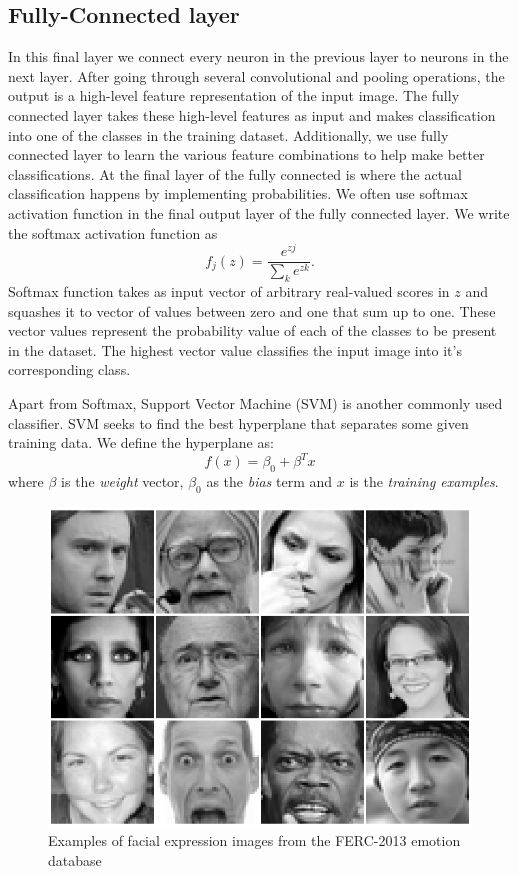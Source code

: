 \documentclass[master]{thesis-uestc}
\begin{document}
\subsection{Fully-Connected layer}
In this final layer we connect every neuron in the previous layer to neurons in the next layer. After going through several convolutional and pooling operations, the output is a high-level feature representation of the input image. The fully connected layer takes these high-level features as input and makes classification into one of the classes in the training dataset. Additionally, we use fully connected layer to learn the various feature combinations to help make better classifications. At the final layer of the fully connected is where the actual classification happens by implementing probabilities. We often use softmax activation function in the final output layer of the fully connected layer. We write the softmax activation function as
\begin{equation*}
    f_j(z) = \frac{e^{zj}}{\sum_{k}^{}e^{zk}}.
\end{equation*}
Softmax function takes as input vector of arbitrary real-valued scores in $z$ and squashes it to vector of values between zero and one that sum up to one. These vector values represent the probability value of each of the classes to be present in the dataset. The highest vector value classifies the input image into it's corresponding class.

Apart from Softmax, Support Vector Machine (SVM) is another commonly used classifier. SVM seeks to find the best hyperplane that separates some given training data. We define the hyperplane as:
\[ f(x) = \beta_{0} + \beta^{T} x \]
where $\beta$ is the \textit{weight} vector, $\beta_{0}$ as the \textit{bias} term and $x$ is the \textit{training examples}.

\begin{figure}[ht]
\includegraphics[width=5in]{pic/fer2013.png}
\caption{Examples of facial expression images from the FERC-2013 emotion database}
\label{fer2013_images}
\end{figure}
\end{document}
